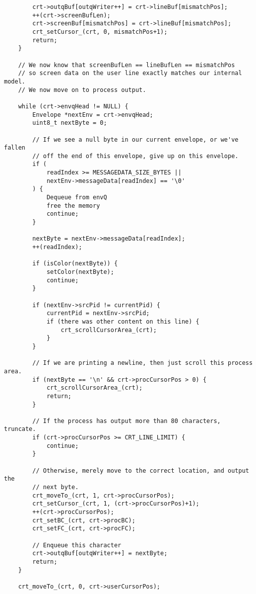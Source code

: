 \documentclass[12pt]{report}
\begin{document}
\begin{lstlisting}
        crt->outqBuf[outqWriter++] = crt->lineBuf[mismatchPos];
        ++(crt->screenBufLen);
        crt->screenBuf[mismatchPos] = crt->lineBuf[mismatchPos];
        crt_setCursor_(crt, 0, mismatchPos+1);
        return;
    }

    // We now know that screenBufLen == lineBufLen == mismatchPos
    // so screen data on the user line exactly matches our internal model.
    // We now move on to process output.

    while (crt->envqHead != NULL) {
        Envelope *nextEnv = crt->envqHead;
        uint8_t nextByte = 0;

        // If we see a null byte in our current envelope, or we've fallen
        // off the end of this envelope, give up on this envelope.
        if (
            readIndex >= MESSAGEDATA_SIZE_BYTES ||
            nextEnv->messageData[readIndex] == '\0'
        ) {
            Dequeue from envQ
            free the memory
            continue;
        }

        nextByte = nextEnv->messageData[readIndex];
        ++(readIndex);

        if (isColor(nextByte)) {
            setColor(nextByte);
            continue;
        }

        if (nextEnv->srcPid != currentPid) {
            currentPid = nextEnv->srcPid;
            if (there was other content on this line) {
                crt_scrollCursorArea_(crt);
            }
        }

        // If we are printing a newline, then just scroll this process area.
        if (nextByte == '\n' && crt->procCursorPos > 0) {
            crt_scrollCursorArea_(crt);
            return;
        }

        // If the process has output more than 80 characters, truncate.
        if (crt->procCursorPos >= CRT_LINE_LIMIT) {
            continue;
        }

        // Otherwise, merely move to the correct location, and output the
        // next byte.
        crt_moveTo_(crt, 1, crt->procCursorPos);
        crt_setCursor_(crt, 1, (crt->procCursorPos)+1);
        ++(crt->procCursorPos);
        crt_setBC_(crt, crt->procBC);
        crt_setFC_(crt, crt->procFC);

        // Enqueue this character
        crt->outqBuf[outqWriter++] = nextByte;
        return;
    }

    crt_moveTo_(crt, 0, crt->userCursorPos);

\end{lstlisting}
\end{document}
